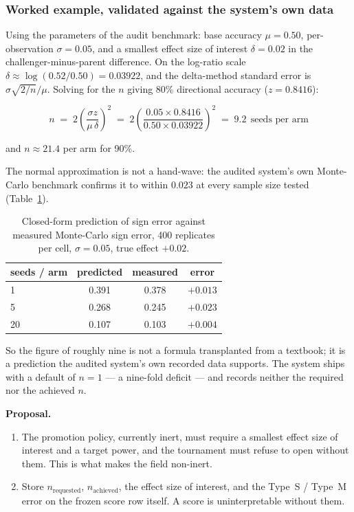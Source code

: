 \documentclass[11pt,letterpaper]{article}
\begin{document}
\subsubsection{Worked example, validated against the system's own data}

Using the parameters of the audit benchmark: base accuracy $\mu = 0.50$,
per-observation $\sigma = 0.05$, and a smallest effect size of interest
$\delta = 0.02$ in the challenger-minus-parent difference. On the log-ratio
scale $\delta \approx \log(0.52/0.50) = 0.03922$, and the delta-method standard
error is $\sigma\sqrt{2/n}/\mu$. Solving for the $n$ giving 80\% directional
accuracy ($z = 0.8416$):

\begin{equation}
n \;=\; 2\left(\frac{\sigma z}{\mu\,\delta}\right)^{2}
   \;=\; 2\left(\frac{0.05 \times 0.8416}{0.50 \times 0.03922}\right)^{2}
   \;=\; \mathbf{9.2} \ \ \text{seeds per arm}
\end{equation}

and $n \approx 21.4$ per arm for 90\%.

The normal approximation is not a hand-wave: the audited system's own Monte-Carlo
benchmark confirms it to within $0.023$ at every sample size tested
(Table~\ref{tab:valid}).

\begin{table}[h]
\centering
\caption{Closed-form prediction of sign error against measured Monte-Carlo sign
error, 400 replicates per cell, $\sigma = 0.05$, true effect $+0.02$.}
\label{tab:valid}
\begin{tabular}{@{}lccc@{}}
\toprule
\textbf{seeds / arm} & \textbf{predicted} & \textbf{measured} & \textbf{error} \\
\midrule
1  & 0.391 & 0.378 & $+0.013$ \\
5  & 0.268 & 0.245 & $+0.023$ \\
20 & 0.107 & 0.103 & $+0.004$ \\
\bottomrule
\end{tabular}
\end{table}

So the figure of roughly nine is not a formula transplanted from a textbook; it is
a prediction the audited system's own recorded data supports. The system ships
with a default of $n = 1$ --- a nine-fold deficit --- and records neither the
required nor the achieved $n$.

\textbf{Proposal.}
\begin{enumerate}
\item The promotion policy, currently inert, must require a smallest effect size of
interest and a target power, and the tournament must refuse to open without them.
This is what makes the field non-inert.
\item Store $n_{\text{requested}}$, $n_{\text{achieved}}$, the effect size of
interest, and the Type~S / Type~M error \cite{gelman2014} on the frozen score row
itself. A score is uninterpretable without them.
\end{enumerate}
\end{document}
